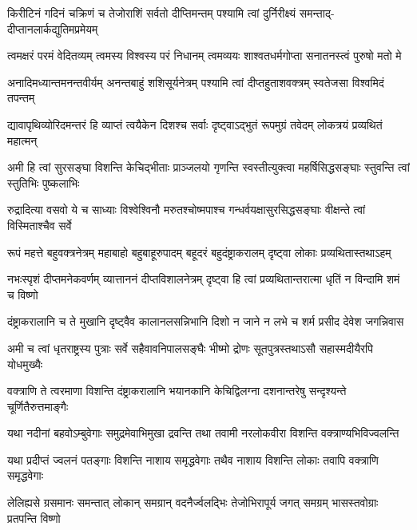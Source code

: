 \fourlineindentedshloka
{किरीटिनं गदिनं चक्रिणं च}
{तेजोराशिं सर्वतो दीप्तिमन्तम्}
{पश्यामि त्वां दुर्निरीक्ष्यं समन्ताद्-}
{दीप्तानलार्कद्युतिमप्रमेयम्}%

\fourlineindentedshloka
{त्वमक्षरं परमं वेदितव्यम्}
{त्वमस्य विश्वस्य परं निधानम्}
{त्वमव्ययः शाश्वतधर्मगोप्ता}
{सनातनस्त्वं पुरुषो मतो मे}%

\fourlineindentedshloka
{अनादिमध्यान्तमनन्तवीर्यम्}
{अनन्तबाहुं शशिसूर्यनेत्रम्}
{पश्यामि त्वां दीप्तहुताशवक्त्रम्}
{स्वतेजसा विश्वमिदं तपन्तम्}%

\fourlineindentedshloka
{द्यावापृथिव्योरिदमन्तरं हि}
{व्याप्तं त्वयैकेन दिशश्च सर्वाः}
{दृष्ट्वाऽद्भुतं रूपमुग्रं तवेदम्}
{लोकत्रयं प्रव्यथितं महात्मन्}%

\fourlineindentedshloka
{अमी हि त्वां सुरसङ्घा विशन्ति}
{केचिद्भीताः प्राञ्जलयो गृणन्ति}
{स्वस्तीत्युक्त्वा महर्षिसिद्धसङ्घाः}
{स्तुवन्ति त्वां स्तुतिभिः पुष्कलाभिः}%

\fourlineindentedshloka
{रुद्रादित्या वसवो ये च साध्याः}
{विश्वेश्विनौ मरुतश्चोष्मपाश्च}
{गन्धर्वयक्षासुरसिद्धसङ्घाः}
{वीक्षन्ते त्वां विस्मिताश्चैव सर्वे}%

\fourlineindentedshloka
{रूपं महत्ते बहुवक्त्रनेत्रम्}
{महाबाहो बहुबाहूरुपादम्}
{बहूदरं बहुदंष्ट्राकरालम्}
{दृष्ट्वा लोकाः प्रव्यथितास्तथाऽहम्}%

\fourlineindentedshloka
{नभःस्पृशं दीप्तमनेकवर्णम्}
{व्यात्ताननं दीप्तविशालनेत्रम्}
{दृष्ट्वा हि त्वां प्रव्यथितान्तरात्मा}
{धृतिं न विन्दामि शमं च विष्णो}%

\fourlineindentedshloka
{दंष्ट्राकरालानि च ते मुखानि}
{दृष्ट्वैव कालानलसन्निभानि}
{दिशो न जाने न लभे च शर्म}
{प्रसीद देवेश जगन्निवास}%

\fourlineindentedshloka
{अमी च त्वां धृतराष्ट्रस्य पुत्राः}
{सर्वे सहैवावनिपालसङ्घैः}
{भीष्मो द्रोणः सूतपुत्रस्तथाऽसौ}
{सहास्मदीयैरपि योधमुख्यैः}%

\fourlineindentedshloka
{वक्त्राणि ते त्वरमाणा विशन्ति}
{दंष्ट्राकरालानि भयानकानि}
{केचिद्विलग्ना दशनान्तरेषु}
{सन्दृश्यन्ते चूर्णितैरुत्तमाङ्गैः}%

\fourlineindentedshloka
{यथा नदीनां बहवोऽम्बुवेगाः}
{समुद्रमेवाभिमुखा द्रवन्ति}
{तथा तवामी नरलोकवीरा}
{विशन्ति वक्त्राण्यभिविज्वलन्ति}%

\fourlineindentedshloka
{यथा प्रदीप्तं ज्वलनं पतङ्गाः}
{विशन्ति नाशाय समृद्धवेगाः}
{तथैव नाशाय विशन्ति लोकाः}
{तवापि वक्त्राणि समृद्धवेगाः}%

\fourlineindentedshloka
{लेलिह्यसे ग्रसमानः समन्तात्}
{लोकान् समग्रान् वदनैर्ज्वलद्भिः}
{तेजोभिरापूर्य जगत् समग्रम्}
{भासस्तवोग्राः प्रतपन्ति विष्णो}%

